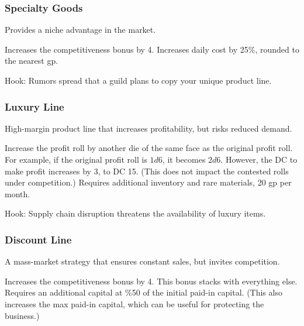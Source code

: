 \documentclass[twocolumn]{dndbook}
\begin{document}
\subsubsection{Specialty Goods}

Provides a niche advantage in the market.

\begin{DndComment}[color=bgtan2018]{}
	Increases the competitiveness bonus by 4.
	Increases daily cost by 25\%, rounded to the nearest gp.
\end{DndComment}

Hook: Rumors spread that a guild plans to copy your unique product line.\par


\subsubsection{Luxury Line}

High-margin product line that increases profitability, but risks reduced demand.

\begin{DndComment}[color=bgtan2018]{}
	Increase the profit roll by another die of the same face as the original profit roll.
	For example, if the original profit roll is $1d6$, it becomes $2d6$.
	However, the DC to make profit increases by 3, to DC 15.
	(This does not impact the contested rolls under competition.)
	Requires additional inventory and rare materials, 20 gp per month.
\end{DndComment}

Hook: Supply chain disruption threatens the availability of luxury items.\par


\subsubsection{Discount Line}

A mass-market strategy that ensures constant sales, but invites competition.\par

\begin{DndComment}[color=bgtan2018]{}
	Increases the competitiveness bonus by 4.
	This bonus stacks with everything else.
	Requires an additional capital at \%50 of the initial paid-in capital.
	(This also increases the max paid-in capital, which can be useful for protecting the business.)
\end{DndComment}
\end{document}
